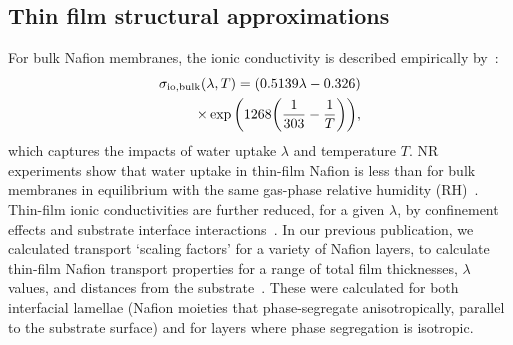 \documentclass[final,3p,times,twocolumn]{elsarticle}    %
\newcommand{\crr}[1]{\color{red} #1 \color{black}}
\newcommand{\scd}[1]{\color{red} #1 \color{black}}%
\begin{document}
\subsection{Thin film structural approximations}
\crr{For bulk Nafion membranes, the ionic conductivity is described empirically by~\cite{bib:springer_1991}:
\begin{equation} \label{eq:sigma-bulk}
\begin{split}
    \sigma_{\rm io, bulk}(\lambda,T) = (0.5139\lambda - 0.326) \\
                                     \times \exp \bigg( 1268 \bigg( \frac{1}{303} 
                                     - \frac{1}{T} \bigg) \bigg),
\end{split}
\end{equation}
which captures the impacts of water uptake $\lambda$ and temperature $T$. NR experiments show that water uptake in thin-film Nafion is less than for bulk membranes in equilibrium with the same gas-phase  relative humidity (RH)~\cite{bib:dura_2009, bib:decaluwe_2018}.}\scd{ Thin-film ionic conductivities are further reduced, for a given $\lambda$, by confinement effects and substrate interface interactions~\cite{bib:wood_2009, bib:ito_2020, bib:dura_2009, bib:shrivastava_2018, bib:decaluwe_2018}. In our previous publication, we calculated transport `scaling factors' for a variety of Nafion layers, to calculate thin-film Nafion transport properties for a range of total film thicknesses, $\lambda$ values, and distances from the substrate~\cite{bib:decaluwe_2018}. These were calculated for both interfacial lamellae (Nafion moieties that phase-segregate anisotropically, parallel to the substrate surface) and for layers where phase segregation is isotropic.

}
\end{document}
